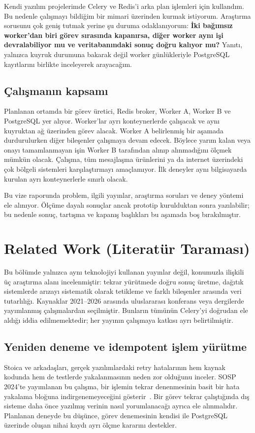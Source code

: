 \documentclass[conference,a4paper]{IEEEtran}
\begin{document}
Kendi yazılım projelerimde Celery ve Redis'i arka plan işlemleri için kullandım. Bu nedenle çalışmayı bildiğim bir mimari üzerinden kurmak istiyorum. Araştırma sorusunu çok geniş tutmak yerine şu duruma odaklanıyorum: \textbf{İki bağımsız worker'dan biri görev sırasında kapanırsa, diğer worker aynı işi devralabiliyor mu ve veritabanındaki sonuç doğru kalıyor mu?} Yanıtı, yalnızca kuyruk durumuna bakarak değil worker günlükleriyle PostgreSQL kayıtlarını birlikte inceleyerek arayacağım.

\subsection{Çalışmanın kapsamı}
Planlanan ortamda bir görev üretici, Redis broker, Worker A, Worker B ve PostgreSQL yer alıyor. Worker'lar ayrı konteynerlerde çalışacak ve aynı kuyruktan ağ üzerinden görev alacak. Worker A belirlenmiş bir aşamada durdurulurken diğer bileşenler çalışmaya devam edecek. Böylece yarım kalan veya onayı tamamlanmayan işin Worker B tarafından alınıp alınmadığını ölçmek mümkün olacak. Çalışma, tüm mesajlaşma ürünlerini ya da internet üzerindeki çok bölgeli sistemleri karşılaştırmayı amaçlamıyor. İlk deneyler aynı bilgisayarda kurulan ayrı konteynerlerle sınırlı olacak.

Bu vize raporunda problem, ilgili yayınlar, araştırma soruları ve deney yöntemi ele alınıyor. Ölçüme dayalı sonuçlar ancak prototip kurulduktan sonra yazılabilir; bu nedenle sonuç, tartışma ve kapanış başlıkları bu aşamada boş bırakılmıştır.

\section{Related Work (Literatür Taraması)}
Bu bölümde yalnızca aynı teknolojiyi kullanan yayınlar değil, konumuzla ilişkili üç araştırma alanı incelenmiştir: tekrar yürütmede doğru sonuç üretme, dağıtık sistemlerde arızayı sistematik olarak tetikleme ve farklı bileşenler arasında veri tutarlılığı. Kaynaklar 2021--2026 arasında uluslararası konferans veya dergilerde yayımlanmış çalışmalardan seçilmiştir. Bunların tümünün Celery'yi doğrudan ele aldığı iddia edilmemektedir; her yayının çalışmaya katkısı ayrı belirtilmiştir.

\subsection{Yeniden deneme ve idempotent işlem yürütme}
Stoica ve arkadaşları, gerçek yazılımlardaki retry hatalarının hem kaynak kodunda hem de testlerde yakalanmasının neden zor olduğunu inceler. SOSP 2024'te yayımlanan bu çalışma, bir işlemin tekrar denenmesinin basit bir hata yakalama bloğuna indirgenemeyeceğini gösterir~\cite{stoica2024}. Bir görev tekrar çalıştığında dış sisteme daha önce yazılmış verinin nasıl yorumlanacağı ayrıca ele alınmalıdır. Planlanan deneyde bu düşünce, görev denemesinin kendisi ile PostgreSQL üzerinde oluşan nihai kaydı ayrı ölçme kararını destekler.
\end{document}
